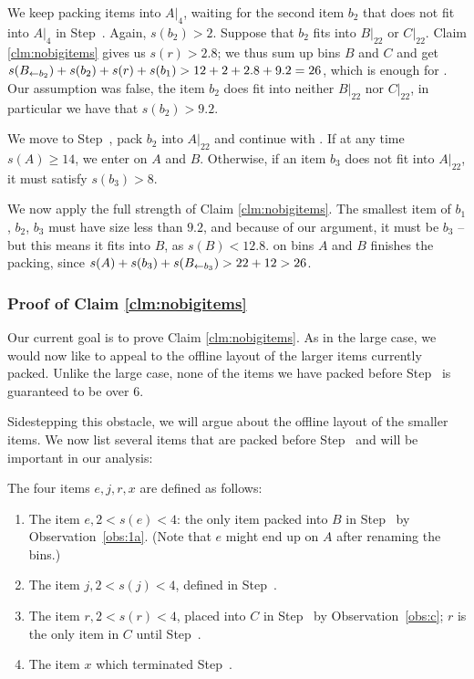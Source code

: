 We keep packing items into $A|_{4}$, waiting for the second item $b_2$
that does not fit into $A|_4$ in Step~. Again, $s(b_2) >
2$. Suppose that $b_2$ fits into $B|_{22}$ or $C|_{22}$. Claim \ref{clm:nobigitems}
gives us $s(r)>2.8$; we thus sum up bins $B$ and $C$ and get $s(B_{\leftarrow b_2}) +
s(b_2) + s(r) + s(b_1) > 12 + 2 + 2.8 + 9.2 = 26$, which is enough for
.  Our assumption was false, the item $b_2$ does 
fit into neither $B|_{22}$ nor $C|_{22}$, in particular we have that $s(b_2)>9.2$.

We move to Step~, pack $b_2$ into $A|_{22}$ and continue
with . If at any time $s(A) \ge  14$, we
enter  on $A$ and $B$. Otherwise, if an item $b_3$ does not fit into $A|_{22}$,
it must satisfy $s(b_3) > 8$.

We now apply the full strength of Claim \ref{clm:nobigitems}. The
smallest item of $b_1$, $b_2$, $b_3$ must have size less than $9.2$,
and because of our argument, it must be $b_3$ -- but this means it
fits into $B$, as $s(B)<12.8$.  on bins $A$ and $B$ finishes the
packing, since $s(A) + s(b_3) + s(B_{\leftarrow b_3}) > 22 + 12 > 26$.

\subsubsection{Proof of Claim \ref{clm:nobigitems}}\label{sec:profOfClaim}

Our current goal is to prove Claim \ref{clm:nobigitems}.
As in the large case, we would now like to appeal to the offline
layout of the larger items currently packed. Unlike the large case,
none of the items we have packed before Step~ is guaranteed to be over $6$.

Sidestepping this obstacle, we will argue about the offline layout of
the smaller items. We now list several items that are packed before Step~ and will be important in our analysis:

\begin{dfn}\label{dfn:fouritems} The four items $e,j,r,x$ are defined as follows:
\begin{enumerate}
\item The item $e, 2 < s(e) < 4$: the only item packed into $B$ in Step~{\rm {}}
by Observation~\ref{obs:1a}.
(Note that $e$ might end up on $A$ after renaming the bins.)
\item The item $j, 2 < s(j) < 4$, defined in Step~{\rm {}}.
\item The item $r, 2 < s(r) < 4$, placed into $C$ in Step~{\rm {}} by Observation~\ref{obs:c}; $r$ is the only item in $C$ until Step~{\rm {}}.
\item The item $x$ which terminated Step~{\rm {}}.
\end{enumerate}

\end{dfn}

